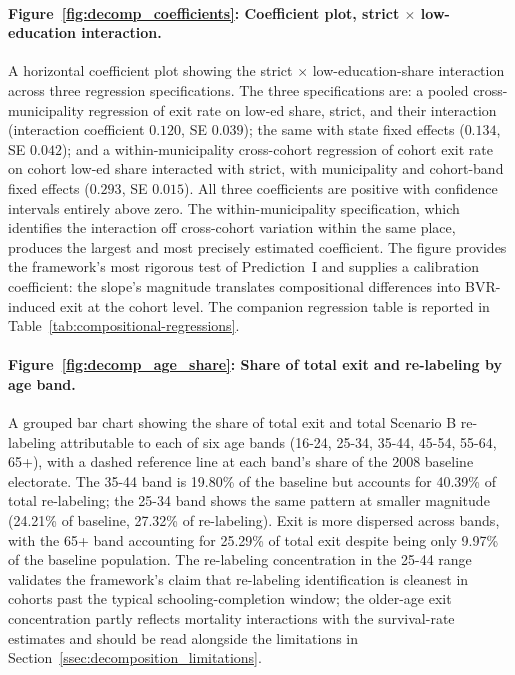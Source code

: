 \paragraph{Figure~\ref{fig:decomp_coefficients}: Coefficient plot, strict $\times$ low-education interaction.} A horizontal coefficient plot showing the strict $\times$ low-education-share interaction across three regression specifications. The three specifications are: a pooled cross-municipality regression of exit rate on low-ed share, strict, and their interaction (interaction coefficient $0.120$, SE $0.039$); the same with state fixed effects ($0.134$, SE $0.042$); and a within-municipality cross-cohort regression of cohort exit rate on cohort low-ed share interacted with strict, with municipality and cohort-band fixed effects ($0.293$, SE $0.015$). All three coefficients are positive with confidence intervals entirely above zero. The within-municipality specification, which identifies the interaction off cross-cohort variation within the same place, produces the largest and most precisely estimated coefficient. The figure provides the framework's most rigorous test of Prediction~I and supplies a calibration coefficient: the slope's magnitude translates compositional differences into BVR-induced exit at the cohort level. The companion regression table is reported in Table~\ref{tab:compositional-regressions}.

\paragraph{Figure~\ref{fig:decomp_age_share}: Share of total exit and re-labeling by age band.} A grouped bar chart showing the share of total exit and total Scenario B re-labeling attributable to each of six age bands (16-24, 25-34, 35-44, 45-54, 55-64, 65+), with a dashed reference line at each band's share of the 2008 baseline electorate. The 35-44 band is 19.80\% of the baseline but accounts for 40.39\% of total re-labeling; the 25-34 band shows the same pattern at smaller magnitude (24.21\% of baseline, 27.32\% of re-labeling). Exit is more dispersed across bands, with the 65+ band accounting for 25.29\% of total exit despite being only 9.97\% of the baseline population. The re-labeling concentration in the 25-44 range validates the framework's claim that re-labeling identification is cleanest in cohorts past the typical schooling-completion window; the older-age exit concentration partly reflects mortality interactions with the survival-rate estimates and should be read alongside the limitations in Section~\ref{ssec:decomposition_limitations}.

